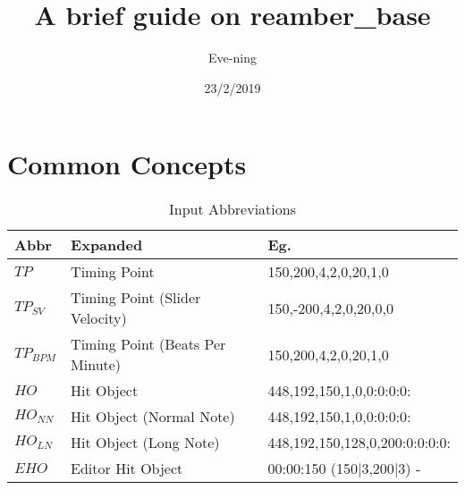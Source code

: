 \documentclass{article}
\title{A brief guide on reamber\_base}
\date{23/2/2019}
\author{Eve-ning}
\begin{document}
\maketitle
\newpage
\part{Common Concepts}

\begin{table}[ht]
  \begin{center}
    \caption{Input Abbreviations}
    \label{tab:tbl_abbr}
    \begin{tabular}{l|l|l}
    
		\textbf{Abbr} & \textbf{Expanded} & \textbf{Eg.}\\
		\hline
		$ TP $      & Timing Point                    & 150,200,4,2,0,20,1,0\\
		$ TP_{SV} $ & Timing Point (Slider Velocity)  & 150,-200,4,2,0,20,0,0\\
		$ TP_{BPM} $& Timing Point (Beats Per Minute) & 150,200,4,2,0,20,1,0\\
		\hline
		$ HO $      & Hit Object                      & 448,192,150,1,0,0:0:0:0:\\
		$ HO_{NN} $ & Hit Object (Normal Note)        & 448,192,150,1,0,0:0:0:0:\\
		$ HO_{LN} $ & Hit Object (Long Note)          & 448,192,150,128,0,200:0:0:0:0:\\
		$ EHO $     & Editor Hit Object               & 00:00:150 (150$|$3,200$|$3) - \\
		\end{tabular}
	\end{center}
\end{table}
\end{document}
